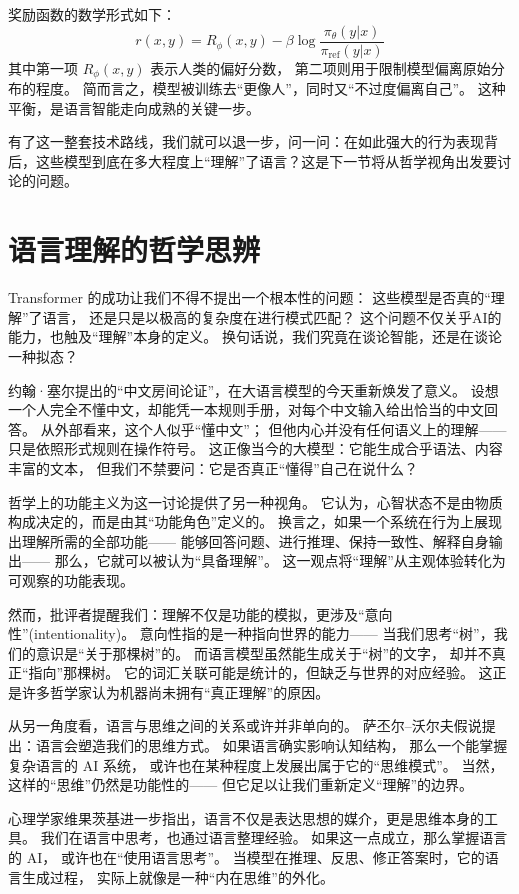 奖励函数的数学形式如下：  
\[
r(x, y) = R_\phi(x, y) - \beta \log \frac{\pi_\theta(y|x)}{\pi_{\text{ref}}(y|x)}
\]  
其中第一项 $R_\phi(x, y)$ 表示人类的偏好分数，  
第二项则用于限制模型偏离原始分布的程度。  
简而言之，模型被训练去“更像人”，同时又“不过度偏离自己”。  
这种平衡，是语言智能走向成熟的关键一步。  

有了这一整套技术路线，我们就可以退一步，问一问：在如此强大的行为表现背后，这些模型到底在多大程度上“理解”了语言？这是下一节将从哲学视角出发要讨论的问题。

\section{语言理解的哲学思辨}

Transformer 的成功让我们不得不提出一个根本性的问题：  
这些模型是否真的“理解”了语言，  
还是只是以极高的复杂度在进行模式匹配？  
这个问题不仅关乎AI的能力，也触及“理解”本身的定义。  
换句话说，我们究竟在谈论智能，还是在谈论一种拟态？  

约翰·塞尔提出的“中文房间论证”，在大语言模型的今天重新焕发了意义。  
设想一个人完全不懂中文，却能凭一本规则手册，对每个中文输入给出恰当的中文回答。  
从外部看来，这个人似乎“懂中文”；  
但他内心并没有任何语义上的理解——只是依照形式规则在操作符号。  
这正像当今的大模型：它能生成合乎语法、内容丰富的文本，  
但我们不禁要问：它是否真正“懂得”自己在说什么？  

哲学上的功能主义为这一讨论提供了另一种视角。  
它认为，心智状态不是由物质构成决定的，而是由其“功能角色”定义的。  
换言之，如果一个系统在行为上展现出理解所需的全部功能——  
能够回答问题、进行推理、保持一致性、解释自身输出——  
那么，它就可以被认为“具备理解”。  
这一观点将“理解”从主观体验转化为可观察的功能表现。  

然而，批评者提醒我们：理解不仅是功能的模拟，更涉及“意向性”(intentionality)。  
意向性指的是一种指向世界的能力——  
当我们思考“树”，我们的意识是“关于那棵树”的。  
而语言模型虽然能生成关于“树”的文字，  
却并不真正“指向”那棵树。  
它的词汇关联可能是统计的，但缺乏与世界的对应经验。  
这正是许多哲学家认为机器尚未拥有“真正理解”的原因。  

从另一角度看，语言与思维之间的关系或许并非单向的。  
萨丕尔–沃尔夫假说提出：语言会塑造我们的思维方式。  
如果语言确实影响认知结构，  
那么一个能掌握复杂语言的 AI 系统，  
或许也在某种程度上发展出属于它的“思维模式”。  
当然，这样的“思维”仍然是功能性的——  
但它足以让我们重新定义“理解”的边界。  

心理学家维果茨基进一步指出，语言不仅是表达思想的媒介，更是思维本身的工具。  
我们在语言中思考，也通过语言整理经验。  
如果这一点成立，那么掌握语言的 AI，  
或许也在“使用语言思考”。  
当模型在推理、反思、修正答案时，它的语言生成过程，  
实际上就像是一种“内在思维”的外化。  


